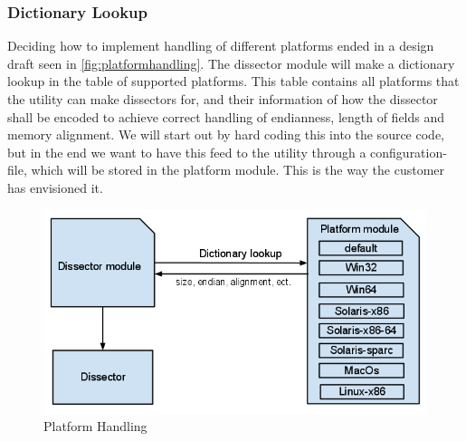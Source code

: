 \subsubsection{Dictionary Lookup}
Deciding how to implement handling of different platforms ended in a design draft seen in \autoref{fig:platformhandling}. The \gls{dissector} module will make a dictionary lookup in the table of supported platforms. This table contains all platforms that the \gls{utility} can make \glspl{dissector} for, and their information of how the \gls{dissector} shall be encoded to achieve correct handling of \gls{endianness}, length of fields and memory alignment.
We will start out by hard coding this into the source code, but in the end we want to have this feed to the \gls{utility} through a configuration-file, which will be stored in the platform module. This is the way the customer has envisioned it.  

\begin{figure}[!htb]
	\includegraphics[width=\textwidth]{./sprints/img/platformhandling}
	\caption{Platform Handling\label{fig:platformhandling}}
\end{figure}

